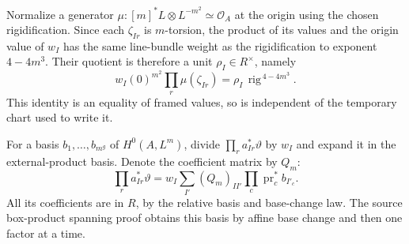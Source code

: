 Normalize a generator
\(\mu:[m]^*L\otimes L^{-m^2}\simeq\mathcal O_A\)
at the origin using the chosen rigidification.
Since each \(\zeta_{Ir}\) is \(m\)-torsion, the product of its
values and the origin value of \(w_I\) has the same line-bundle
weight as the rigidification to exponent \(4-4m^3\).
Their quotient is therefore a unit \(\rho_I\in R^\times\), namely
\[
 w_I(0)^{m^2}\prod_r\mu(\zeta_{Ir})
              =\rho_I\,\operatorname{rig}^{\,4-4m^3}.
 \tag{K8}\label{eq:ftb-rho-normalization}
\]
This identity is an equality of framed values, so is independent of
the temporary chart used to write it.

For a basis \(b_1,\ldots,b_{m^g}\) of \(H^0(A,L^m)\), divide
\(\prod_r a_{Ir}^*\vartheta\) by \(w_I\) and expand it in the
external-product basis.  Denote the coefficient matrix by \(Q_m\):
\[
 \prod_r a_{Ir}^*\vartheta
   =w_I\sum_{I'}(Q_m)_{II'}\prod_c\operatorname{pr}_c^*b_{I'_c}.
 \tag{K9}\label{eq:ftb-box-matrix}
\]
All its coefficients are in \(R\), by the relative basis and
base-change law.  The source box-product spanning proof obtains this
basis by affine base change and then one factor at a time.


